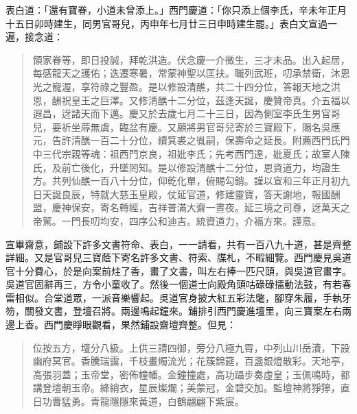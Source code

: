 表白道：「還有寶眷，小道未曾添上。」西門慶道：「你只添上個李氏，辛未年正月十五日卯時建生，同男官哥兒，丙申年七月廿三日申時建生罷。」表白文宣過一遍，接念道：
\begin{quote}
領家眷等，即日投誠，拜乾洪造。伏念慶一介微生，三才未品。出入起居，每感龍天之護佑；迭遷寒暑，常蒙神聖以匡扶。職列武班，叨承禁衛，沐恩光之寵渥，享符祿之豐盈。是以修設清醮，共二十四分位，答報天地之洪恩，酬祝皇王之巨澤。又修清醮十二分位，茲逢天誕，慶贊帝真。介五福以遐昌，迓諸天而下邁。慶又於去歲七月二十三日，因為側室李氏生男官哥兒，要祈坐蓐無虞，臨盆有慶。又願將男官哥兒寄於三寶殿下，賜名吳應元，告許清醮一百二十分位，續箕裘之㣧嗣，保壽命之延長。附薦西門氏門中三代宗親等魂：祖西門京良，祖妣李氏；先考西門達，妣夏氏；故室人陳氏，及前亡後化，升墜罔知。是以修設清醮十二分位，恩資道力，均證生方。共列仙醮一百八十分位，仰乾化單，俯賜勾銷。謹以宣和三年正月初九日天誕良辰，特就大慈玉皇殿，仗延官道，修建靈寶，答天謝地，報國酬盟，慶神保安，寄名轉經，吉祥普滿大齋一晝夜。延三境之司尊，迓萬天之帝駕。一門長叨均安，四序公和迪吉。統資道力，介福方來。謹意。
\end{quote}

宣畢齋意，鋪設下許多文書符命、表白，一一請看，共有一百八九十道，甚是齊整詳細。又是官哥兒三寶蔭下寄名許多文書、符索、牒札，不暇細覽。西門慶見吳道官十分費心，於是向案前炷了香，畫了文書，叫左右捧一匹尺頭，與吳道官畫字。吳道官固辭再三，方令小童收了。然後一個道士向殿角頭咕碌碌擂動法鼓，有若春雷相似。合堂道眾，一派音樂響起。吳道官身披大紅五彩法氅，腳穿朱履，手執牙笏，關發文書，登壇召將。兩邊鳴起鐘來。鋪排引西門慶進壇里，向三寶案左右兩邊上香。西門慶睜眼觀看，果然鋪設齋壇齊整。但見：
\begin{quote}
位按五方，壇分八級。上供三請四御，旁分八極九霄，中列山川岳瀆，下設幽府冥官。香騰瑞靄，千枝畫燭流光；花簇錦筵，百盞銀燈散彩。天地亭，高張羽蓋；玉帝堂，密佈幢幡。金鐘撞處，高功躡步奏虛皇；玉佩鳴時，都講登壇朝玉帝。絳綃衣，星辰燦爛；美蒙冠，金碧交加。監壇神將猙獰，直日功曹猛勇。青龍隱隱來黃道，白鶴翩翩下紫宸。
\end{quote}


